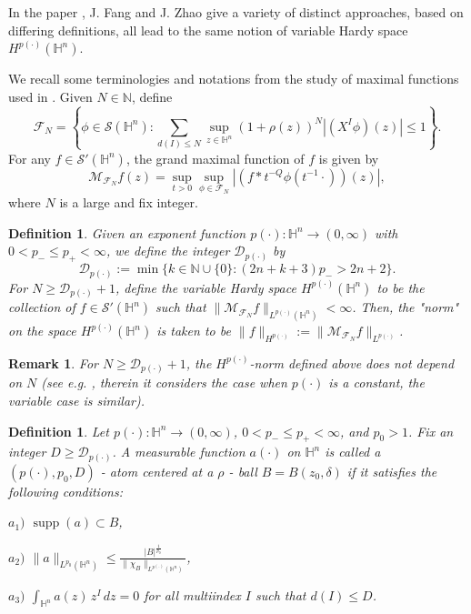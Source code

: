 \documentclass[oneside,10pt]{article}
\newtheorem{definition}[theorem]{Definition}
\newtheorem{remark}[theorem]{Remark}
\DeclareMathOperator\supp{supp}
\begin{document}
In the paper \cite{Fang}, J. Fang and J. Zhao give a variety of distinct approaches, based on differing definitions, all lead to the same notion of variable Hardy space $H^{p(\cdot)}(\mathbb{H}^n)$.

We recall some terminologies and notations from the study of maximal functions used in \cite{Fang}. Given $N \in \mathbb{N}$, define 
\[
\mathcal{F}_{N}=\left\{ \phi \in \mathcal{S}(\mathbb{H}^{n}):\sum\limits_{d(I) \leq N}
\sup\limits_{z \in \mathbb{H}^{n}}\left( 1 + \rho(z) \right)^{N} | (X^{I} \phi) (z) | \leq 1\right\}.
\]
For any $f \in \mathcal{S}'(\mathbb{H}^{n})$, the grand maximal function of $f$ is given by 
\[
\mathcal{M}_{\mathcal{F}_{N}}f(z)=\sup\limits_{t>0}\sup\limits_{\phi\in\mathcal{F}_{N}} 
\left\vert \left( f \ast t^{-Q}\phi(t^{-1} \cdot) \right)(z) \right\vert,
\]
where $N$ is a large and fix integer.

\begin{definition} \label{Dp def} Given an exponent function $p(\cdot):\mathbb{H}^{n} \to ( 0,\infty)$ with $0 < p_{-} \leq p_{+} < \infty$, we define the integer $\mathcal{D}_{p(\cdot)}$ by
\[
\mathcal{D}_{p(\cdot)} := \min \{ k \in \mathbb{N} \cup \{0\} : (2n+k+3) p_{-} > 2n+2 \}.
\]
For $N \geq \mathcal{D}_{p(\cdot)} + 1$, define 
the variable Hardy space $H^{p(\cdot)}(\mathbb{H}^{n})$ to be the collection of $f \in \mathcal{S}'(\mathbb{H}^{n})$ such that
$\| \mathcal{M}_{\mathcal{F}_{N}} f \|_{L^{p(\cdot)}(\mathbb{H}^{n})} < \infty$. Then, the "norm" on the space $H^{p(\cdot)}(\mathbb{H}^{n})$ is taken to be
$\| f \|_{H^{p(\cdot)}} := \| \mathcal{M}_{\mathcal{F}_{N}} f \|_{L^{p(\cdot)}}$.
\end{definition}

\begin{remark}
For $N \geq \mathcal{D}_{p(\cdot)} + 1$, the $H^{p(\cdot)}$-norm defined above does not depend on $N$ (see e.g. \cite{Foll-St}, therein it considers the case when $p(\cdot)$ is a constant, the variable case is similar).
\end{remark}

\begin{definition} \label{atom} Let $p(\cdot):\mathbb{H}^{n} \to ( 0,\infty)$, $0 < p_{-} \leq p_{+} < \infty $, and $p_{0} > 1$. 
Fix an integer $D \geq \mathcal{D}_{p(\cdot)}$. A measurable function $a(\cdot)$ on $\mathbb{H}^{n}$ is called a $(p(\cdot), p_{0}, D)$ - atom centered at a $\rho$ - ball $B=B(z_0, \delta)$ if it satisfies the following conditions:

$a_{1})$ $\supp(a) \subset B$,

$a_{2})$ $\| a \|_{L^{p_{0}}(\mathbb{H}^{n})} \leq 
\displaystyle{\frac{| B |^{\frac{1}{p_{0}}}}{\| \chi _{B} \|_{L^{p(\cdot)}(\mathbb{H}^{n})}}}$,

$a_{3})$ $\displaystyle{\int_{\mathbb{H}^{n}}} a(z) \, z^{I} \, dz = 0$ for all multiindex $I$ such that $d(I) \leq D$.
\end{definition}
\end{document}
